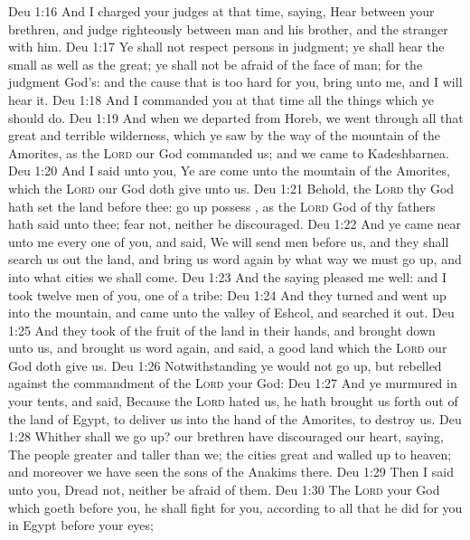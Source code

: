 \vs Deu 1:16 And I charged your judges at that time, saying, Hear  between your brethren, and judge righteously between  man and his brother, and the stranger  with him.
\vs Deu 1:17 Ye shall not respect persons in judgment;  ye shall hear the small as well as the great; ye shall not be afraid of the face of man; for the judgment  God's: and the cause that is too hard for you, bring  unto me, and I will hear it.
\vs Deu 1:18 And I commanded you at that time all the things which ye should do.
\vs Deu 1:19 And when we departed from Horeb, we went through all that great and terrible wilderness, which ye saw by the way of the mountain of the Amorites, as the \textsc{Lord} our God commanded us; and we came to Kadeshbarnea.
\vs Deu 1:20 And I said unto you, Ye are come unto the mountain of the Amorites, which the \textsc{Lord} our God doth give unto us.
\vs Deu 1:21 Behold, the \textsc{Lord} thy God hath set the land before thee: go up  possess , as the \textsc{Lord} God of thy fathers hath said unto thee; fear not, neither be discouraged.
\vs Deu 1:22 And ye came near unto me every one of you, and said, We will send men before us, and they shall search us out the land, and bring us word again by what way we must go up, and into what cities we shall come.
\vs Deu 1:23 And the saying pleased me well: and I took twelve men of you, one of a tribe:
\vs Deu 1:24 And they turned and went up into the mountain, and came unto the valley of Eshcol, and searched it out.
\vs Deu 1:25 And they took of the fruit of the land in their hands, and brought  down unto us, and brought us word again, and said,  a good land which the \textsc{Lord} our God doth give us.
\vs Deu 1:26 Notwithstanding ye would not go up, but rebelled against the commandment of the \textsc{Lord} your God:
\vs Deu 1:27 And ye murmured in your tents, and said, Because the \textsc{Lord} hated us, he hath brought us forth out of the land of Egypt, to deliver us into the hand of the Amorites, to destroy us.
\vs Deu 1:28 Whither shall we go up? our brethren have discouraged our heart, saying, The people  greater and taller than we; the cities  great and walled up to heaven; and moreover we have seen the sons of the Anakims there.
\vs Deu 1:29 Then I said unto you, Dread not, neither be afraid of them.
\vs Deu 1:30 The \textsc{Lord} your God which goeth before you, he shall fight for you, according to all that he did for you in Egypt before your eyes;
